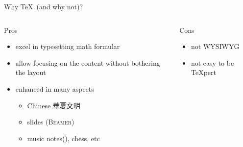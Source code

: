 \documentclass{beamer}
\begin{document}
\begin{frame}{Why \TeX\ (and why not)?}
  \begin{columns}[t]
    \begin{column}{.45\textwidth}
      \begin{block}{Pros}
        \begin{itemize}
          \item excel in typesetting math formular%
          \item allow focusing on the content without bothering the
            layout
          \item enhanced in many aspects
            \begin{itemize}
              \item Chinese 華夏文明
              \item slides ({\scshape Beamer})
              \item music notes(\twonotes), chess, etc
            \end{itemize}
        \end{itemize}
      \end{block}
    \end{column}

    \begin{column}{.45\textwidth}
      \begin{block}{Cons}
        \begin{itemize}
          \item not WYSIWYG
          \item not easy to be \TeX{}pert
        \end{itemize}
      \end{block}
    \end{column}

  \end{columns}
\end{frame}
\end{document}
